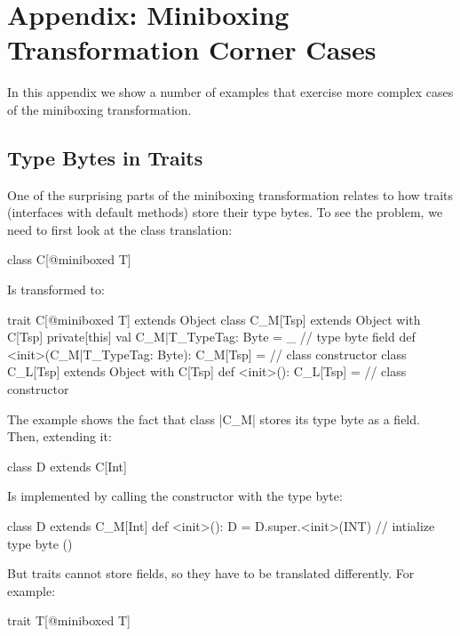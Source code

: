\section{Appendix: Miniboxing Transformation Corner Cases}

In this appendix we show a number of examples that exercise more complex cases of the miniboxing transformation.

\subsection{Type Bytes in Traits}

One of the surprising parts of the miniboxing transformation relates to how traits (interfaces with default methods) store their type bytes. To see the problem, we need to first look at the class translation:

\begin{lstlisting-nobreak}
class C[@miniboxed T]
\end{lstlisting-nobreak}

Is transformed to:

\begin{lstlisting-nobreak}
trait C[@miniboxed T] extends Object
class C_M[Tsp] extends Object with C[Tsp] {
  private[this] val C_M|T_TypeTag: Byte = _ // type byte field
  def <init>(C_M|T_TypeTag: Byte): C_M[Tsp] = // class constructor
}
class C_L[Tsp] extends Object with C[Tsp] {
  def <init>(): C_L[Tsp] =  // class constructor
}
\end{lstlisting-nobreak}

The example shows the fact that class |C_M| stores its type byte as a field. Then, extending it:

\begin{lstlisting-nobreak}
class D extends C[Int]
\end{lstlisting-nobreak}

Is implemented by calling the constructor with the type byte:

\begin{lstlisting-nobreak}
class D extends C_M[Int] {
  def <init>(): D = {
    D.super.<init>(INT) // intialize type byte
    ()
  }
}
\end{lstlisting-nobreak}

But traits cannot store fields, so they have to be translated differently. For example:

\begin{lstlisting-nobreak}
trait T[@miniboxed T]
\end{lstlisting-nobreak}

